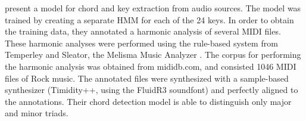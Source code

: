 \textcite{lee2007unified} present a model for chord and key
extraction from audio sources. The model was trained by
creating a separate HMM for each of the 24 keys. In order to
obtain the training data, they annotated a harmonic analysis
of several MIDI files. These harmonic analyses were
performed using the rule-based system from Temperley and
Sleator, the Melisma Music Analyzer
\textcite{temperley2004cognition}. The corpus for performing
the harmonic analysis was obtained from mididb.com, and
consisted 1046 MIDI files of Rock music. The annotated files
were synthesized with a sample-based synthesizer
(Timidity++, using the FluidR3 soundfont) and perfectly
aligned to the annotations. Their chord detection model is
able to distinguish only major and minor triads.






